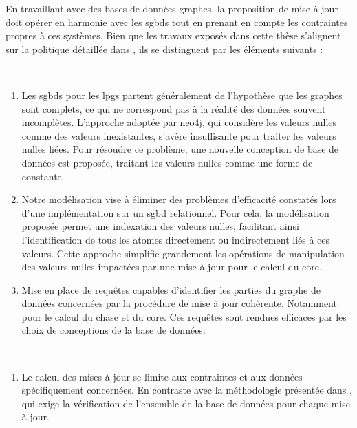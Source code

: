 En travaillant avec des bases de données graphes, la proposition de mise à jour doit opérer en harmonie avec les \glspl{sgbd} tout en prenant en compte les contraintes propres à ces systèmes.
Bien que les travaux exposés dans cette thèse s'alignent sur la politique détaillée dans \cite{chabinConsistentUpdatingDatabases2020}, ils se distinguent par les éléments suivants :

\begin{description}[wide=0pt]
    \item[Conception de la base de données] ~
          \begin{enumerate}
              \item Les \glspl{sgbd} pour les \glspl{lpg} partent généralement de l'hypothèse que les graphes sont complets, ce qui ne correspond pas à la réalité des données souvent incomplètes.
                    L'approche adoptée par \gls{neo4j}, qui considère les valeurs nulles comme des valeurs inexistantes, s'avère insuffisante pour traiter les valeurs nulles liées.
                    Pour résoudre ce problème, une nouvelle conception de base de données est proposée, traitant les valeurs nulles comme une forme de constante.

              \item Notre modélisation vise à éliminer des problèmes d'efficacité constatés lors d'une implémentation sur un \gls{sgbd} relationnel.
                    Pour cela, la modélisation proposée permet une indexation des valeurs nulles, facilitant ainsi l'identification de tous les atomes directement ou indirectement liés à ces valeurs.
                    Cette approche simplifie grandement les opérations de manipulation des valeurs nulles impactées par une mise à jour pour le calcul du \gls{core}.

              \item Mise en place de requêtes capables d'identifier les parties du graphe de données concernées par la procédure de mise à jour cohérente.
                    Notamment pour le calcul du \gls{chase} et du \gls{core}.
                    Ces requêtes sont rendues efficaces par les choix de conceptions de la base de données.
          \end{enumerate}

    \item[Approche incrémentale] ~
          \begin{enumerate}
              \item Le calcul des mises à jour se limite aux contraintes et aux données spécifiquement concernées.
                    En contraste avec la méthodologie présentée dans \cite{chabinConsistentUpdatingDatabases2020}, qui exige la vérification de l'ensemble de la base de données pour chaque mise à jour.


\end{enumerate}
\end{description}
